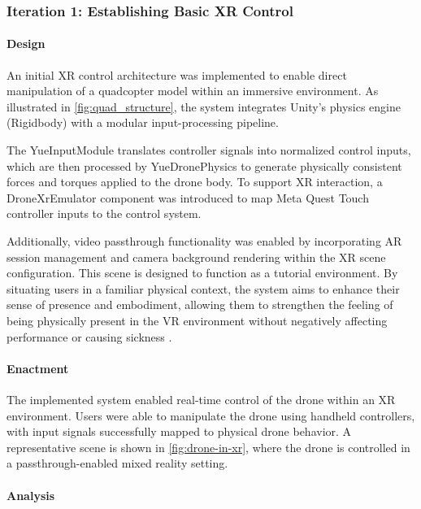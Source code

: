 \subsubsection{Iteration 1: Establishing Basic XR Control}

\paragraph{Design}

An initial XR control architecture was implemented to enable direct manipulation of a quadcopter model within an immersive environment. As illustrated in \cref{fig:quad_structure}, the system integrates Unity's physics engine (Rigidbody) with a modular input-processing pipeline. 

The YueInputModule translates controller signals into normalized control inputs, which are then processed by YueDronePhysics to generate physically consistent forces and torques applied to the drone body. To support XR interaction, a DroneXrEmulator component was introduced to map Meta Quest Touch controller inputs to the control system.

Additionally, video passthrough functionality was enabled by incorporating AR session management and camera background rendering within the XR scene configuration. This scene is designed to function as a tutorial environment. By situating users in a familiar physical context, the system aims to enhance their sense of presence and embodiment, allowing them to strengthen the feeling of being physically present in the VR environment without negatively affecting performance or causing sickness \parencite{waldow_investigating_2025}.




\paragraph{Enactment}

The implemented system enabled real-time control of the drone within an XR environment. Users were able to manipulate the drone using handheld controllers, with input signals successfully mapped to physical drone behavior. A representative scene is shown in \cref{fig:drone-in-xr}, where the drone is controlled in a passthrough-enabled mixed reality setting.

\paragraph{Analysis}

